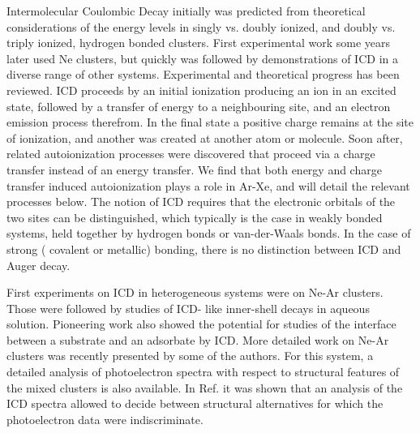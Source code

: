 Intermolecular Coulombic Decay initially was predicted from 
theoretical considerations of the energy levels in singly vs. 
doubly ionized, and doubly vs. triply ionized, hydrogen bonded 
clusters.\cite{cederbaum} First experimental work some years 
later used Ne clusters,\cite{marburger,jahnkenedimer} but quickly 
was followed by demonstrations of ICD in a diverse range of other 
systems. Experimental and theoretical progress has been reviewed.
\cite{hergenhahn_review, averbukh_review, jahnke_review} ICD 
proceeds by an initial ionization producing an ion in an excited 
state, followed by a transfer of energy to a neighbouring site, 
and an electron emission process therefrom. In the final state a 
positive charge remains at the site of ionization, and another 
was created at another atom or molecule. Soon after, related 
autoionization processes were discovered that proceed via a 
charge transfer instead of an energy transfer. 
We find that both energy and charge transfer induced 
autoionization plays a role in Ar-Xe, and will detail the 
relevant processes below. The notion of ICD requires that the 
electronic orbitals of the two sites can be distinguished, which 
typically is the case in weakly bonded systems, held together by 
hydrogen bonds or van-der-Waals bonds. In the case of strong (
covalent or metallic) bonding, there is no distinction between 
ICD and Auger decay.\cite{hergenhahn_review}

First experiments on ICD in heterogeneous systems were on Ne-Ar 
clusters.\cite{barthnear} Those were followed by studies of ICD-
like inner-shell decays in aqueous solution.\cite{
aziz,pokapanich,pokapanich2011} Pioneering work also showed the 
potential for studies of the interface between a substrate and an 
adsorbate by ICD.\cite{grieves} More detailed work on Ne-Ar 
clusters was recently presented by some of the authors.\cite{
fasshauer2014} For this system, a detailed analysis of 
photoelectron spectra with respect to structural features of the 
mixed clusters is also available.\cite{lundwall} In Ref.  it was shown that an analysis of the ICD spectra 
allowed to decide between structural alternatives for which the 
photoelectron data were indiscriminate.

